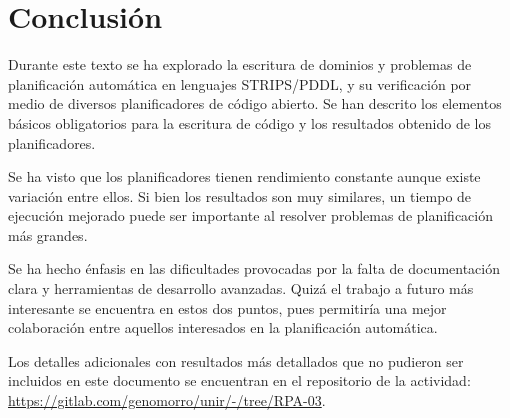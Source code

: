 \documentclass[a4paper,12pt,twocolumn]{article}
\begin{document}
\section{Conclusión}

Durante este texto se ha explorado la escritura de dominios y problemas de planificación automática en lenguajes STRIPS/PDDL, y su verificación por medio de diversos planificadores de código abierto. Se han descrito los elementos básicos obligatorios para la escritura de código y los resultados obtenido de los planificadores.

Se ha visto que los planificadores tienen rendimiento constante aunque existe variación entre ellos. Si bien los resultados son muy similares, un tiempo de ejecución mejorado puede ser importante al resolver problemas de planificación más grandes.

Se ha hecho énfasis en las dificultades provocadas por la falta de documentación clara y herramientas de desarrollo avanzadas. Quizá el trabajo a futuro más interesante se encuentra en estos dos puntos, pues permitiría una mejor colaboración entre aquellos interesados en la planificación automática.

Los detalles adicionales con resultados más detallados que no pudieron ser incluidos en este documento se encuentran en el repositorio de la actividad: \href{https://gitlab.com/genomorro/unir/-/tree/RPA-03}{https://gitlab.com/genomorro/unir/-/tree/RPA-03}.



\end{document}
